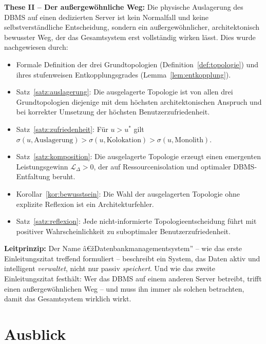 ﻿\documentclass[a4paper,12pt]{article}
\theoremstyle{definition}
\begin{document}
\textbf{These II -- Der außergewöhnliche Weg:} Die physische Auslagerung des DBMS auf einen dedizierten Server ist kein Normalfall und keine selbstverständliche Entscheidung, sondern ein außergewöhnlicher, architektonisch bewusster Weg, der das Gesamtsystem erst vollständig wirken lässt. Dies wurde nachgewiesen durch:
\begin{itemize}
  \item Formale Definition der drei Grundtopologien (Definition~\ref{def:topologie}) und ihres stufenweisen Entkopplungsgrades (Lemma~\ref{lem:entkopplung}).
  \item Satz~\ref{satz:auslagerung}: Die ausgelagerte Topologie ist von allen drei Grundtopologien diejenige mit dem höchsten architektonischen Anspruch und bei korrekter Umsetzung der höchsten Benutzerzufriedenheit.
  \item Satz~\ref{satz:zufriedenheit}: Für $u > u^*$ gilt $\sigma(u, \text{Auslagerung}) > \sigma(u, \text{Kolokation}) > \sigma(u, \text{Monolith})$.
  \item Satz~\ref{satz:komposition}: Die ausgelagerte Topologie erzeugt einen emergenten Leistungsgewinn $\mathcal{L}_\Delta > 0$, der auf Ressourcenisolation und optimaler DBMS-Entfaltung beruht.
  \item Korollar~\ref{kor:bewusstsein}: Die Wahl der ausgelagerten Topologie ohne explizite Reflexion ist ein Architekturfehler.
  \item Satz~\ref{satz:reflexion}: Jede nicht-informierte Topologieentscheidung führt mit positiver Wahrscheinlichkeit zu suboptimaler Benutzerzufriedenheit.
\end{itemize}

\textbf{Leitprinzip:} Der Name â€žDatenbankmanagementsystem'' -- wie das erste Einleitungszitat treffend formuliert -- beschreibt ein System, das Daten aktiv und intelligent \emph{verwaltet}, nicht nur passiv \emph{speichert}. Und wie das zweite Einleitungszitat festhält: Wer das DBMS auf einem anderen Server betreibt, trifft einen außergewöhnlichen Weg -- und muss ihn immer als solchen betrachten, damit das Gesamtsystem wirklich wirkt.

\section{Ausblick}
\label{sec:ausblick}
\end{document}
